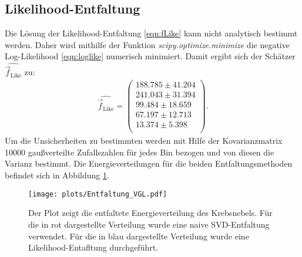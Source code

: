 \subsection{Likelihood-Entfaltung}
Die Lösung der Likelihood-Entfaltung \eqref{eqn:fLike} kann nicht analytisch bestimmt werden. Daher wird mithilfe der Funktion \textit{scipy.optimize.minimize} die negative Log-Likelihood \eqref{eqn:loglike} numerisch minimiert. Damit ergibt sich der Schätzer $\hat{\vec{f}_{\text{Like}}}$ zu:\\
\begin{align*}
	\hat{\vec{f}_{\text{Like}}} = \begin{pmatrix}
			188.785 \pm 41.204\\
			241.043 \pm 31.394\\
			99.484 \pm 18.659\\
			67.197 \pm 12.713\\
			13.374 \pm 5.398\\
	\end{pmatrix}.
\end{align*}
Um die Unsicherheiten zu bestimmten werden mit Hilfe der Kovarianzmatrix 10000 gaußverteilte Zufallszahlen für jedes Bin bezogen und von diesen die Varianz bestimmt.
Die Energieverteilungen für die beiden Entfaltungsmethoden befindet sich in Abbildung \ref{fig:E3}.
\begin{figure}
  \centering
  \texttt{[image: plots/Entfaltung\_VGL.pdf]}
  \caption{Der Plot zeigt die entfaltete Energieverteilung des Krebsnebels. Für die in rot dargestellte Verteilung wurde eine naive SVD-Entfaltung verwendet. Für die in blau dargestellte Verteilung wurde eine Likelihood-Entafltung durchgeführt.}
  \label{fig:E3}
\end{figure}
